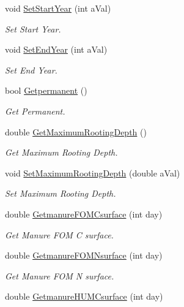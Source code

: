 \begin{DoxyCompactItemize}
void \mbox{\hyperlink{class_crop_class_a695a94a4096789748dfdc5a087480c43}{Set\+Start\+Year}} (int a\+Val)
\begin{DoxyCompactList}\small\item\em Set Start Year. \end{DoxyCompactList}\item 
void \mbox{\hyperlink{class_crop_class_aae4526fb10124338a29d0cfbcc93db7e}{Set\+End\+Year}} (int a\+Val)
\begin{DoxyCompactList}\small\item\em Set End Year. \end{DoxyCompactList}\item 
bool \mbox{\hyperlink{class_crop_class_ad8f2a1890592959b10bc626a2f85c93a}{Getpermanent}} ()
\begin{DoxyCompactList}\small\item\em Get Permanent. \end{DoxyCompactList}\item 
double \mbox{\hyperlink{class_crop_class_a4c47e81d7f855b6433e4be443fa27466}{Get\+Maximum\+Rooting\+Depth}} ()
\begin{DoxyCompactList}\small\item\em Get Maximum Rooting Depth. \end{DoxyCompactList}\item 
void \mbox{\hyperlink{class_crop_class_ae211dd0ead3203552c3228e53d390441}{Set\+Maximum\+Rooting\+Depth}} (double a\+Val)
\begin{DoxyCompactList}\small\item\em Set Maximum Rooting Depth. \end{DoxyCompactList}\item 
double \mbox{\hyperlink{class_crop_class_af286463ec31e335517e89f046d349a1a}{Getmanure\+F\+O\+M\+Csurface}} (int day)
\begin{DoxyCompactList}\small\item\em Get Manure F\+OM C surface. \end{DoxyCompactList}\item 
double \mbox{\hyperlink{class_crop_class_ae26a1b93ce62ef13eaa40c463fa24c92}{Getmanure\+F\+O\+M\+Nsurface}} (int day)
\begin{DoxyCompactList}\small\item\em Get Manure F\+OM N surface. \end{DoxyCompactList}\item 
double \mbox{\hyperlink{class_crop_class_ac2d29d7d8d81c021821ae92b038787b1}{Getmanure\+H\+U\+M\+Csurface}} (int day)

\end{DoxyCompactItemize}

